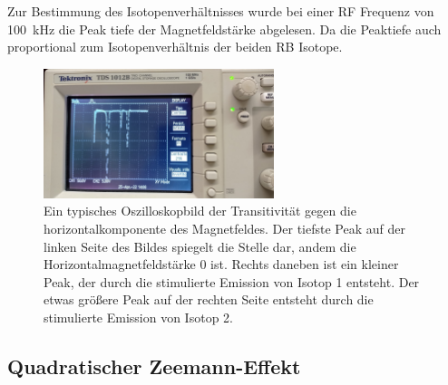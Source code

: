 		\noindent
		Zur Bestimmung des Isotopenverhältnisses wurde bei einer RF Frequenz von \SI{100}{\kilo\hertz} die Peak tiefe der Magnetfeldstärke abgelesen. Da die Peaktiefe auch proportional zum Isotopenverhältnis der beiden RB Isotope.
		
		\begin{figure}[H]
			\centering
			\includegraphics[width=0.6\textwidth]{latex/images/Messbild.jpeg}
			\caption{Ein typisches Oszilloskopbild der Transitivität gegen die horizontalkomponente des Magnetfeldes. 
			Der tiefste Peak auf der linken Seite des Bildes spiegelt die Stelle dar, andem die Horizontalmagnetfeldstärke 0 ist.
			Rechts daneben ist ein kleiner Peak, der durch die stimulierte Emission von Isotop 1 entsteht. 
			Der etwas größere Peak auf der rechten Seite entsteht durch die stimulierte Emission von Isotop 2.}
		\end{figure}	
	
	\subsection{Quadratischer Zeemann-Effekt}
